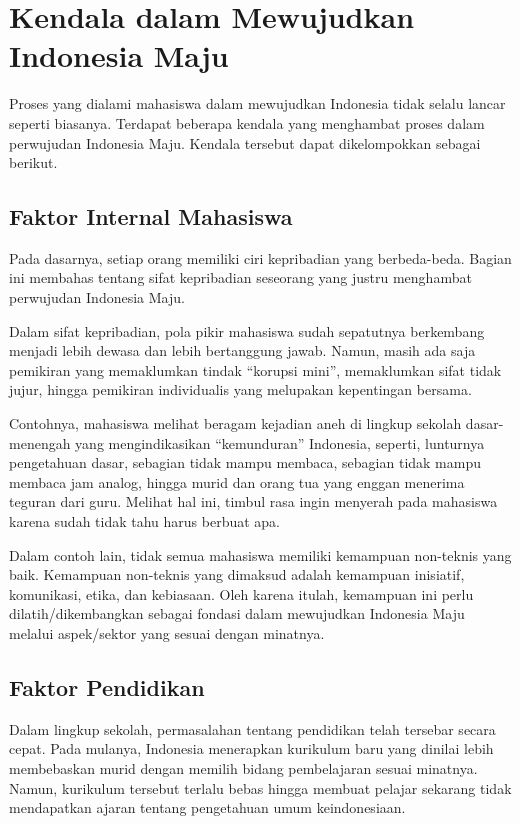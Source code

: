 \section{Kendala dalam Mewujudkan Indonesia Maju}

Proses yang dialami mahasiswa dalam mewujudkan Indonesia tidak selalu lancar seperti biasanya. Terdapat beberapa kendala yang menghambat proses dalam perwujudan Indonesia Maju. Kendala tersebut dapat dikelompokkan sebagai berikut.

\subsection{Faktor Internal Mahasiswa}

Pada dasarnya, setiap orang memiliki ciri kepribadian yang berbeda-beda. Bagian ini membahas tentang sifat kepribadian seseorang yang justru menghambat perwujudan Indonesia Maju.

Dalam sifat kepribadian, pola pikir mahasiswa sudah sepatutnya berkembang menjadi lebih dewasa dan lebih bertanggung jawab. Namun, masih ada saja pemikiran yang memaklumkan tindak “korupsi mini”, memaklumkan sifat tidak jujur, hingga pemikiran individualis yang melupakan kepentingan bersama. 

Contohnya, mahasiswa melihat beragam kejadian aneh di lingkup sekolah dasar-menengah yang mengindikasikan “kemunduran” Indonesia, seperti, lunturnya pengetahuan dasar, sebagian tidak mampu membaca, sebagian tidak mampu membaca jam analog, hingga murid dan orang tua yang enggan menerima teguran dari guru. Melihat hal ini, timbul rasa ingin menyerah pada mahasiswa karena sudah tidak tahu harus berbuat apa.

Dalam contoh lain, tidak semua mahasiswa memiliki kemampuan non-teknis yang baik. Kemampuan non-teknis yang dimaksud adalah kemampuan inisiatif, komunikasi, etika, dan kebiasaan. Oleh karena itulah, kemampuan ini perlu dilatih/dikembangkan sebagai fondasi dalam mewujudkan Indonesia Maju melalui aspek/sektor yang sesuai dengan minatnya. 

\subsection{Faktor Pendidikan}

Dalam lingkup sekolah, permasalahan tentang pendidikan telah tersebar secara cepat. Pada mulanya, Indonesia menerapkan kurikulum baru yang dinilai lebih membebaskan murid dengan memilih bidang pembelajaran sesuai minatnya. Namun, kurikulum tersebut terlalu bebas hingga membuat pelajar sekarang tidak mendapatkan ajaran tentang pengetahuan umum keindonesiaan.

